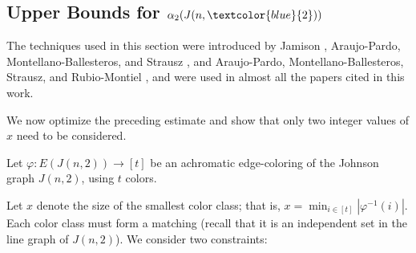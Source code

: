 \documentclass{article}
\newcommand{\blue}[1]{\textcolor{blue}{#1}}
\newcommand{\red}[1]{\textcolor{red}{#1}}
\begin{document}






\subsection{Upper Bounds for $\alpha_2(J(n,\blue{2}))$}
\label{subsec:upperbound}

The techniques used in this section were introduced by Jamison \cite{j89}, Araujo-Pardo, Montellano-Ballesteros, and Strausz \cite{apms11}, and Araujo-Pardo, Montellano-Ballesteros, Strausz, and Rubio-Montiel \cite{apmsr14}, and were used in almost all the papers cited in this work. 

We now optimize the preceding estimate and show that only two integer values of $x$ need to be considered.


Let $ \varphi : E(J(n,2)) \to [t] $ be an achromatic edge-coloring of the Johnson graph $J(n,2)$, using $t$ colors. 

Let $x$ denote the size of the smallest color class; that is, $x = \min_{i \in [t]} |\varphi^{-1}(i)|$. Each color class must form a matching (recall that it is an independent set in the line graph of $J(n,2)$). We consider two constraints:
\end{document}

